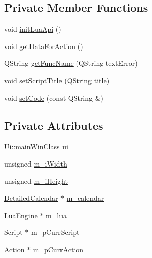 \subsection*{Private Member Functions}
\begin{DoxyCompactItemize}
\item 
void \hyperlink{classmain_win_a9c0cfda2b24fa6259874caf7ccd4b908}{init\-Lua\-Api} ()
\item 
void \hyperlink{classmain_win_a0bf4d1e69b1c8bbd0d142cd5d2ec9179}{get\-Data\-For\-Action} ()
\item 
Q\-String \hyperlink{classmain_win_ab00961de109eaf86fceed0dc39d53fe8}{get\-Func\-Name} (Q\-String text\-Error)
\item 
void \hyperlink{classmain_win_aa70a0f3f1c66ffa1a7d4012526b56c44}{set\-Script\-Title} (Q\-String title)
\item 
void \hyperlink{classmain_win_a8f8b08fe7876ae565621dd14c5ecb87d}{set\-Code} (const Q\-String \&)
\end{DoxyCompactItemize}
\subsection*{Private Attributes}
\begin{DoxyCompactItemize}
\item 
Ui\-::main\-Win\-Class \hyperlink{classmain_win_a89fa9d3006573378f3195845fe9ed408}{ui}
\item 
unsigned \hyperlink{classmain_win_a698988f67b0f686dba0a8e33187f66a1}{m\-\_\-i\-Width}
\item 
unsigned \hyperlink{classmain_win_afaa8e85eaf3926a8aa141bfc1b2c0c01}{m\-\_\-i\-Height}
\item 
\hyperlink{class_detailed_calendar}{Detailed\-Calendar} $\ast$ \hyperlink{classmain_win_a6a02cf853e63c1ad31759f3ce225ed62}{m\-\_\-calendar}
\item 
\hyperlink{class_lua_engine}{Lua\-Engine} $\ast$ \hyperlink{classmain_win_a96b71dd9a31a4cf6ea5db224a4540458}{m\-\_\-lua}
\item 
\hyperlink{class_script}{Script} $\ast$ \hyperlink{classmain_win_ab391602112d6c25f237da91eae815d47}{m\-\_\-p\-Curr\-Script}
\item 
\hyperlink{class_action}{Action} $\ast$ \hyperlink{classmain_win_a426c3fc67264577231b3deb525ddef99}{m\-\_\-p\-Curr\-Action}
\end{DoxyCompactItemize}


